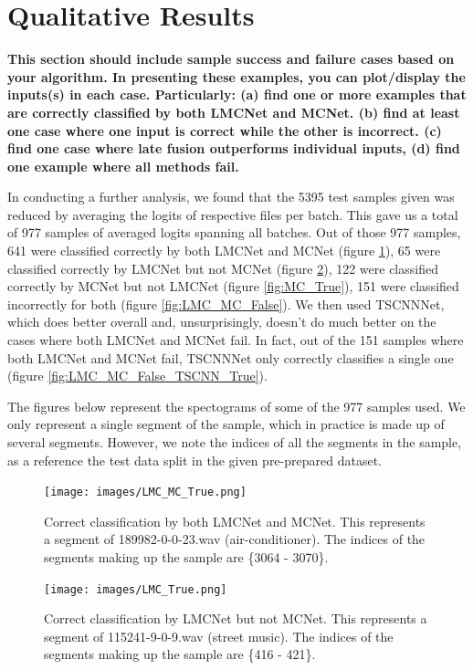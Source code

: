 \documentclass[conference]{IEEEtran}
\begin{document}
\section{Qualitative Results}
\textbf{This section should include sample success and failure cases based on your algorithm. In presenting these examples, you can plot/display the inputs(s) in each case. Particularly: (a) find one or more examples that are correctly classified by both LMCNet and MCNet. (b) find at least one case where one input is correct while the other is incorrect. (c) find one case where late fusion outperforms individual inputs, (d) find one example where all methods fail. }

In conducting a further analysis, we found that the 5395 test samples given was reduced by averaging the logits of respective files per batch. This gave us a total of 977 samples of averaged logits spanning all batches. Out of those 977 samples, 641 were classified correctly by both LMCNet and MCNet (figure \ref{fig:LMC_MC_True}), 65 were classified correctly by LMCNet but not MCNet (figure \ref{fig:LMC_True}), 122 were classified correctly by MCNet but not LMCNet (figure \ref{fig:MC_True}), 151 were classified incorrectly for both (figure \ref{fig:LMC_MC_False}). We then used TSCNNNet, which does better overall and, unsurprisingly, doesn't do much better on the cases where both LMCNet and MCNet fail. In fact, out of the 151 samples where both LMCNet and MCNet fail, TSCNNNet only correctly classifies a single one (figure \ref{fig:LMC_MC_False_TSCNN_True}).

The figures below represent the spectograms of some of the 977 samples used. We only represent a single segment of the sample, which in practice is made up of several segments. However, we note the indices of all the segments in the sample, as a reference the test data split in the given pre-prepared dataset.


\begin{figure}[h]
    \centering
    \texttt{[image: images/LMC\_MC\_True.png]}
    \caption{Correct classification by both LMCNet and MCNet. This represents a segment of 189982-0-0-23.wav (air-conditioner). The indices of the segments making up the sample are \{3064 - 3070\}.}
    \label{fig:LMC_MC_True}
\end{figure}{}

\begin{figure}[h]
    \centering
    \texttt{[image: images/LMC\_True.png]}
    \caption{Correct classification by LMCNet but not MCNet. This represents a segment of 115241-9-0-9.wav (street music). The indices of the segments making up the sample are \{416 - 421\}.}
    \label{fig:LMC_True}
\end{figure}{}
\end{document}
